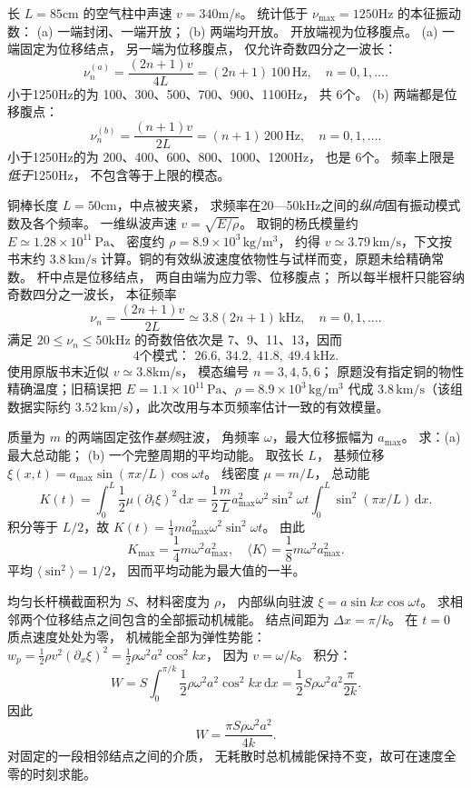 长 $L=85$cm 的空气柱中声速
$v=340$m/s。
统计低于
$\nu_{\max}=1250$Hz 的本征振动数：
(a) 一端封闭、一端开放；
(b) 两端均开放。
开放端视为位移腹点。
\exsolution
(a) 一端固定为位移结点，
另一端为位移腹点，
仅允许奇数四分之一波长：
\[
\boxed{\nu_n^{(a)}
=\frac{(2n+1)v}{4L}
=(2n+1)\,100\,\mathrm{Hz}},
\quad n=0,1,\ldots.
\]
小于1250Hz的为
100、300、500、700、900、1100Hz，
共
$\boxed{6\text{个}}$。
(b) 两端都是位移腹点：
\[
\boxed{\nu_n^{(b)}
=\frac{(n+1)v}{2L}
=(n+1)\,200\,\mathrm{Hz}},
\quad n=0,1,\ldots.
\]
小于1250Hz的为
200、400、600、800、1000、1200Hz，
也是
$\boxed{6\text{个}}$。
\excheck 频率上限是\emph{低于}1250Hz，
不包含等于上限的模态。

铜棒长度 $L=50$cm，中点被夹紧，
求频率在20—50kHz之间的\emph{纵向}固有振动模式数及各个频率。
\exsolution
一维纵波声速
$v=\sqrt{E/\rho}$。
取铜的杨氏模量约
$E\simeq1.28\times10^{11}\,\mathrm{Pa}$、
密度约
$\rho=8.9\times10^3\,\mathrm{kg/m^3}$，
约得 $v\simeq3.79\,\mathrm{km/s}$，下文按书末约 $3.8\,\mathrm{km/s}$ 计算。铜的有效纵波速度依物性与试样而变，原题未给精确常数。
杆中点是位移结点，
两自由端为应力零、位移腹点；
所以每半根杆只能容纳奇数四分之一波长，
本征频率
\[
\boxed{\nu_n=\frac{(2n+1)v}{2L}
\simeq3.8(2n+1)\,\mathrm{kHz}},
\quad n=0,1,\ldots.
\]
满足 $20\le\nu_n\le50$kHz 的奇数倍依次是
7、9、11、13，因而
\[
\boxed{4\text{个模式： }
26.6,\ 34.2,\ 41.8,\ 49.4\ \mathrm{kHz}}.
\]
\excheck 使用原版书末近似 $v\simeq3.8$km/s，
模态编号 $n=3,4,5,6$；
原题没有指定铜的物性精确温度；旧稿误把 $E=1.1\times10^{11}\,\mathrm{Pa}$、$\rho=8.9\times10^3\,\mathrm{kg/m^3}$ 代成 $3.8\,\mathrm{km/s}$（该组数据实际约 $3.52\,\mathrm{km/s}$），此次改用与本页频率估计一致的有效模量。

质量为 $m$ 的两端固定弦作\emph{基频}驻波，
角频率 $\omega$，最大位移振幅为 $a_{\max}$。
求：(a) 最大总动能；
(b) 一个完整周期的平均动能。
\exsolution
取弦长 $L$，
基频位移
$\xi(x,t)=a_{\max}\sin(\pi x/L)\cos\omega t$。
线密度
$\mu=m/L$，
总动能
\[
K(t)=\int_0^L\frac12\mu
(\partial_t\xi)^2\,\mathrm dx
=\frac12\frac mL a_{\max}^2\omega^2
\sin^2\omega t\int_0^L\sin^2(\pi x/L)\,\mathrm dx.
\]
积分等于 $L/2$，故
$K(t)=\frac14m a_{\max}^2\omega^2\sin^2\omega t$。
由此
\[
\boxed{K_{\max}=\frac14m\omega^2a_{\max}^2},
\quad
\boxed{\langle K\rangle=\frac18m\omega^2a_{\max}^2}.
\]
\excheck 平均 $\langle\sin^2\rangle=1/2$，
因而平均动能为最大值的一半。

均匀长杆横截面积为 $S$、材料密度为 $\rho$，
内部纵向驻波
$\xi=a\sin kx\cos\omega t$。
求相邻两个位移结点之间包含的全部振动机械能。
\exsolution
结点间距为
$\Delta x=\pi/k$。
在 $t=0$ 质点速度处处为零，
机械能全部为弹性势能：
$w_p=\tfrac12\rho v^2(\partial_x\xi)^2
=\tfrac12\rho\omega^2a^2\cos^2kx$，
因为 $v=\omega/k$。
积分：
\[
W=S\int_0^{\pi/k}\frac12
\rho\omega^2a^2\cos^2kx\,\mathrm dx
=\frac12S\rho\omega^2a^2\frac{\pi}{2k}.
\]
因此
\[
\boxed{W=\frac{\pi S\rho\omega^2a^2}{4k}}.
\]
\excheck 对固定的一段相邻结点之间的介质，
无耗散时总机械能保持不变，故可在速度全零的时刻求能。

